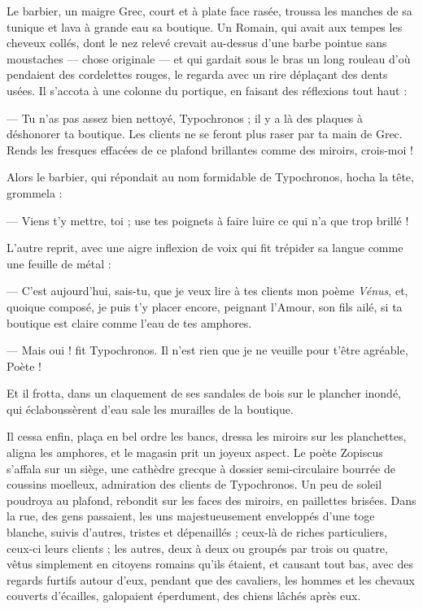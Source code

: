 \documentclass[a4paper, 11pt, oneside, polutonikogreek, french]{article}
\begin{document}
Le barbier, un maigre Grec, court et à plate face rasée, troussa les manches de sa tunique et lava à grande eau sa boutique. Un Romain, qui avait aux tempes les cheveux collés, dont le nez relevé crevait au-dessus d'une barbe pointue sans moustaches --- chose originale --- et qui gardait sous le bras un long rouleau d'où pendaient des cordelettes rouges, le regarda avec un rire déplaçant des dents usées. Il s'accota à une colonne du portique, en faisant des réflexions tout haut :

--- Tu n'as pas assez bien nettoyé, Typochronos ; il y a là des plaques à déshonorer ta boutique. Les clients ne se feront plus raser par ta main de Grec. Rends les fresques effacées de ce plafond brillantes comme des miroirs, crois-moi !

Alors le barbier, qui répondait au nom formidable de Typochronos, hocha la tête, grommela :

--- Viens t'y mettre, toi ; use tes poignets à faire luire ce qui n'a que trop brillé !

L'autre reprit, avec une aigre inflexion de voix qui fit trépider sa langue comme une feuille de métal :

--- C'est aujourd'hui, sais-tu, que je veux lire à tes clients mon poème \emph{Vénus}, et, quoique composé, je puis t'y placer encore, peignant l'Amour, son fils ailé, si ta boutique est claire comme l'eau de tes amphores.

--- Mais oui ! fit Typochronos. Il n'est rien que je ne veuille pour t'être agréable, Poète !

Et il frotta, dans un claquement de ses sandales de bois sur le plancher inondé, qui éclaboussèrent d'eau sale les murailles de la boutique.

Il cessa enfin, plaça en bel ordre les bancs, dressa les miroirs sur les planchettes, aligna les amphores, et le magasin prit un joyeux aspect. Le poète Zopiscus s'affala sur un siège, une cathèdre grecque à dossier semi-circulaire bourrée de coussins moelleux, admiration des clients de Typochronos. Un peu de soleil poudroya au plafond, rebondit sur les faces des miroirs, en paillettes brisées. Dans la rue, des gens passaient, les uns majestueusement enveloppés d'une toge blanche, suivis d'autres, tristes et dépenaillés ; ceux-là de riches particuliers, ceux-ci leurs clients ; les autres, deux à deux ou groupés par trois ou quatre, vêtus simplement en citoyens romains qu'ils étaient, et causant tout bas, avec des regards furtifs autour d'eux, pendant que des cavaliers, les hommes et les chevaux couverts d'écailles, galopaient éperdument, des chiens lâchés après eux.
\end{document}
